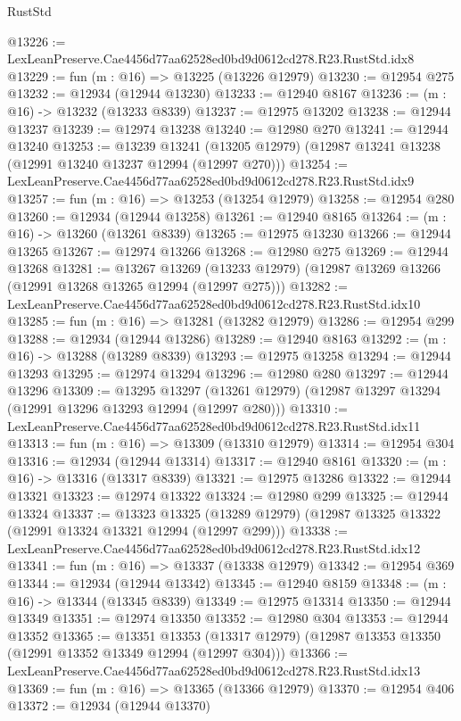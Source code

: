 \begin{lexlean}{RustStd}
\begin{coremodule}
@13226 := LexLeanPreserve.Cae4456d77aa62528ed0bd9d0612cd278.R23.RustStd.idx8
@13229 := fun (m : @16) => @13225 (@13226 @12979)
@13230 := @12954 @275
@13232 := @12934 (@12944 @13230)
@13233 := @12940 @8167
@13236 := (m : @16) -> @13232 (@13233 @8339)
@13237 := @12975 @13202
@13238 := @12944 @13237
@13239 := @12974 @13238
@13240 := @12980 @270
@13241 := @12944 @13240
@13253 := @13239
    @13241
    (@13205 @12979)
    (@12987 @13241 @13238 (@12991 @13240 @13237 @12994 (@12997 @270)))
@13254 := LexLeanPreserve.Cae4456d77aa62528ed0bd9d0612cd278.R23.RustStd.idx9
@13257 := fun (m : @16) => @13253 (@13254 @12979)
@13258 := @12954 @280
@13260 := @12934 (@12944 @13258)
@13261 := @12940 @8165
@13264 := (m : @16) -> @13260 (@13261 @8339)
@13265 := @12975 @13230
@13266 := @12944 @13265
@13267 := @12974 @13266
@13268 := @12980 @275
@13269 := @12944 @13268
@13281 := @13267
    @13269
    (@13233 @12979)
    (@12987 @13269 @13266 (@12991 @13268 @13265 @12994 (@12997 @275)))
@13282 := LexLeanPreserve.Cae4456d77aa62528ed0bd9d0612cd278.R23.RustStd.idx10
@13285 := fun (m : @16) => @13281 (@13282 @12979)
@13286 := @12954 @299
@13288 := @12934 (@12944 @13286)
@13289 := @12940 @8163
@13292 := (m : @16) -> @13288 (@13289 @8339)
@13293 := @12975 @13258
@13294 := @12944 @13293
@13295 := @12974 @13294
@13296 := @12980 @280
@13297 := @12944 @13296
@13309 := @13295
    @13297
    (@13261 @12979)
    (@12987 @13297 @13294 (@12991 @13296 @13293 @12994 (@12997 @280)))
@13310 := LexLeanPreserve.Cae4456d77aa62528ed0bd9d0612cd278.R23.RustStd.idx11
@13313 := fun (m : @16) => @13309 (@13310 @12979)
@13314 := @12954 @304
@13316 := @12934 (@12944 @13314)
@13317 := @12940 @8161
@13320 := (m : @16) -> @13316 (@13317 @8339)
@13321 := @12975 @13286
@13322 := @12944 @13321
@13323 := @12974 @13322
@13324 := @12980 @299
@13325 := @12944 @13324
@13337 := @13323
    @13325
    (@13289 @12979)
    (@12987 @13325 @13322 (@12991 @13324 @13321 @12994 (@12997 @299)))
@13338 := LexLeanPreserve.Cae4456d77aa62528ed0bd9d0612cd278.R23.RustStd.idx12
@13341 := fun (m : @16) => @13337 (@13338 @12979)
@13342 := @12954 @369
@13344 := @12934 (@12944 @13342)
@13345 := @12940 @8159
@13348 := (m : @16) -> @13344 (@13345 @8339)
@13349 := @12975 @13314
@13350 := @12944 @13349
@13351 := @12974 @13350
@13352 := @12980 @304
@13353 := @12944 @13352
@13365 := @13351
    @13353
    (@13317 @12979)
    (@12987 @13353 @13350 (@12991 @13352 @13349 @12994 (@12997 @304)))
@13366 := LexLeanPreserve.Cae4456d77aa62528ed0bd9d0612cd278.R23.RustStd.idx13
@13369 := fun (m : @16) => @13365 (@13366 @12979)
@13370 := @12954 @406
@13372 := @12934 (@12944 @13370)

\end{coremodule}
\end{lexlean}
